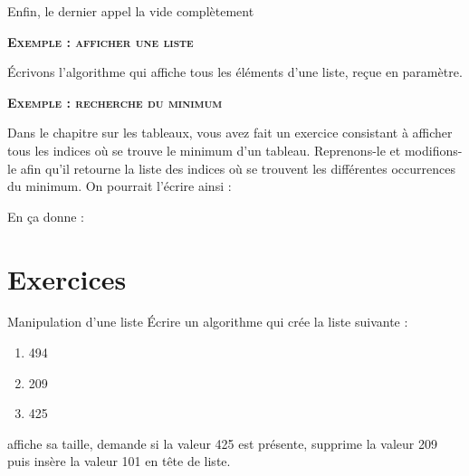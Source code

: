 Enfin, le dernier appel la vide complètement

\bigskip
{\sffamily\bfseries\scshape
	Exemple : afficher une liste}

Écrivons l'algorithme qui affiche tous les éléments d'une liste,
reçue en paramètre.

\begin{algo}
\end{algo}

\bigskip
{\sffamily\bfseries\scshape
	Exemple : recherche du minimum}

Dans le chapitre sur les tableaux, vous avez fait un exercice consistant
à afficher tous les indices où se trouve le minimum d’un tableau.
Reprenons-le et modifions-le afin qu’il retourne la liste des indices
où se trouvent les différentes occurrences du minimum. On pourrait
l’écrire ainsi :

\begin{algo}
\end{algo}

\newpage
En  ça donne :

\section{Exercices}

\begin{Exercice}{Manipulation d'une liste}
	Écrire un algorithme qui crée la liste suivante :
	\begin{enumerate}[start=0]
		\item 494
		\item 209
		\item 425
	\end{enumerate}
	affiche sa taille, demande si la valeur 425 est présente,
	supprime la valeur 209 puis insère la valeur 101 en tête de liste.
\end{Exercice}


